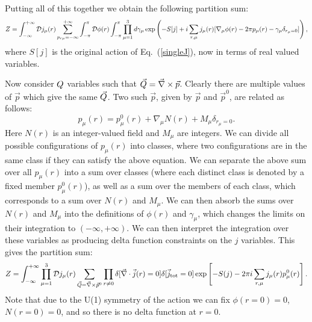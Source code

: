 Putting all of this together we obtain the following partition sum:
\begin{equation}
Z=\int_{-\infty}^{+\infty}{\cal D}j_{\mu}(r) \sum_{p_{r\mu}=-\infty}^{+\infty}\int_{-\pi}^{\pi} {\cal D}\phi(r) \int_{-\pi}^{\pi} \prod_{\mu=1}^{3} d\gamma_{\mu} 
\exp\left(-S[j]+ i \sum_{r,\mu} j_\mu(r)[\nabla_\mu\phi(r) - 2\pi p_\mu(r)- \gamma_\mu \delta_{r_\mu=0}]\right),
\label{duality_mid}
\end{equation}
where $S[j]$ is the original action of Eq.~(\ref{singleJ}), now in terms of real valued variables. 

Now consider $Q$ variables such that $\vec{Q}=\vec{\nabla}\times\vec{p}$. Clearly there are multiple values of $\vec{p}$ which give the same $\vec{Q}$. Two such $\vec{p}$, given by $\vec{p}$ and $\vec{p}^0$, are related as follows:
\begin{equation}
p_\mu(r)=p^0_\mu(r)+\nabla_\mu N(r)+M_\mu \delta_{r_\mu=0}.
\end{equation}
Here $N(r)$ is an integer-valued field and $M_\mu$ are integers. We can divide all possible configurations of $p_\mu(r)$ into classes, where two configurations are in the same class if they can satisfy the above equation. We can separate the above sum over all $p_\mu(r)$ into a sum over classes (where each distinct class is denoted by a fixed member $p_\mu^0(r)$), as well as a sum over the members of each class, which corresponds to a sum over $N(r)$ and $M_\mu$. We can then absorb the sums over $N(r)$ and $M_\mu$ into the definitions of $\phi(r)$ and $\gamma_\mu$, which changes the limits on their integration to $(-\infty,+\infty)$. We can then interpret the integration over these variables as producing delta function constraints on the $j$ variables. This gives the partition sum:
\begin{equation}
Z=\int_{-\infty}^{+\infty}\prod_{\mu=1}^{3}{\cal D}j_{\mu}(r)\sum_{\vec{Q}=\vec{\nabla}\times \vec{p}^0} \prod_{r\neq0} \delta[\vec{\nabla}\cdot\vec{j}(r)=0]\delta[\vec{j}_{\rm tot}=0]  
\exp\left[-S(j)- 2\pi i \sum_{r,\mu} j_\mu(r) p^0_\mu(r)\right].
\label{Z3}
\end{equation}
Note that due to the U(1) symmetry of the action we can fix $\phi(r=0)=0$, $N(r=0)=0$, and so there is no delta function at $r=0$. 

